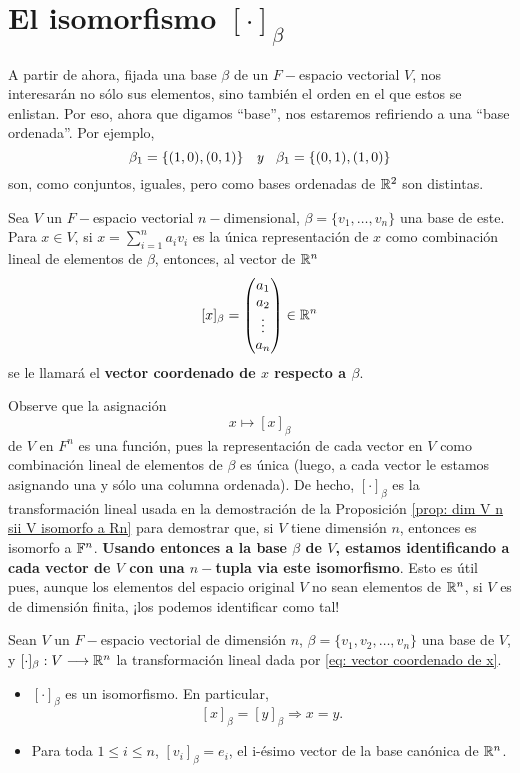 \section{El isomorfismo $[\cdot]_{\beta}$}
A partir de ahora, fijada una base $\beta$ de un 
$F-$espacio vectorial $V$, nos interesarán no sólo sus elementos, sino
también el orden en el que estos se enlistan.
Por eso, ahora que digamos ``base'', nos estaremos refiriendo
a una ``base ordenada''. Por ejemplo,
\[
\beta_{1} = \{ (1, 0), (0, 1) \} \hspace{0.2cm}
\textit{ y }
\hspace{0.2cm}
\beta_{1} = \{ (0, 1), (1, 0) \}
\]
son, como conjuntos, iguales, pero como bases
ordenadas de $\mathbb{R}^{2}$ son distintas.

\begin{defi}
Sea $V$ un $F-$espacio vectorial
$n-$dimensional, $\beta = \{ v_{1}, \ldots, 
v_{n} \}$ una base de este. Para $x \in V$, si 
$x = \sum_{i=1}^{n}a_{i}v_{i}$ es la única representación de 
$x$ como combinación lineal de elementos de $\beta$, entonces,
al vector de $\mathbb{R}^{n}$
\begin{equation}
	\label{eq: vector coordenado de x}
	[x]_{\beta} = \begin{pmatrix}
a_{1} \\ a_{2} \\ \vdots \\ a_{n}
\end{pmatrix} \in \mathbb{R}^{n}
\end{equation}
se le llamará el \textbf{vector coordenado de $x$ respecto a $\beta$}.
\end{defi}

Observe que la asignación
\[
x \mapsto [x]_{\beta}
\]
de $V$ en $F^{n}$ es una función, pues la representación de
cada vector en $V$ como combinación lineal de elementos de 
$\beta$ es única (luego, a cada vector le estamos asignando una
y sólo una columna ordenada).
De hecho, $[\cdot]_{\beta}$
es la transformación lineal usada en 
la demostración de la Proposición
\ref{prop: dim V n sii V isomorfo a Rn} para demostrar que,
si $V$ tiene dimensión $n$, entonces es isomorfo a 
$\mathbb{F}^{n}$. \textbf{Usando entonces a la base $\beta$ de $V$, estamos
identificando a cada vector de $V$ con una $n-$tupla via
este isomorfismo}. 
Esto es útil pues, aunque los elementos del
espacio original $V$ no sean elementos de $\mathbb{R}^{n}$, si $V$ es
de dimensión finita, ¡los podemos
identificar como tal!

\begin{prop}
	Sean $V$ un $F-$espacio vectorial de dimensión $n$, 
$\beta = \{ v_{1}, v_{2}, \ldots, v_{n} \}$ una base de $V$, y 
$[\cdot]_{\beta}: V \longrightarrow \mathbb{R}^{n}$ la transformación lineal
dada por 
\eqref{eq: vector coordenado de x}.
\begin{itemize}
	\item $[\cdot]_{\beta}$ es un isomorfismo. En particular,
	\[
	[x]_{\beta} = [y]_{\beta} \Rightarrow x = y.
	\]
	\item Para toda $1 \leq i \leq n$, $[v_{i}]_{\beta} = e_{i}$, 
	el i-ésimo vector de la base canónica de $\mathbb{R}^{n}$.
\end{itemize}
\end{prop}


